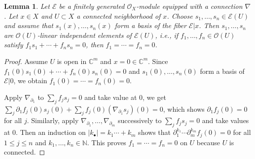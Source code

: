 \documentclass[12pt,a4paper,notitlepage]{report}
\theoremstyle{definition}
\theoremstyle{plain}
\newtheorem{lm}[df]{Lemma}
\newcommand{\id}{\mathbf{1}}
\newcommand{\scr}{\mathscr}
\newcommand{\mbb}{\mathbb}
\newcommand{\blt}{\bullet}
\newcommand{\Cbb}{\mathbb C}
\newcommand{\Nbb}{\mathbb N}
\numberwithin{equation}{section}
\begin{document}






\begin{lm}\label{lb61}
Let $\scr E$ be a finitely generated $\scr O_X$-module equipped with a connection $\nabla$. Let $x\in X$ and $U\subset X$ a connected neighborhood of $x$.  Choose $s_1,\dots,s_n\in\scr E(U)$ and assume that $s_1(x),\dots,s_n(x)$ form a basis of the fiber $\scr E|x$. Then $s_1,\dots,s_n$ are $\scr O(U)$-linear independent elements of $\scr E(U)$, i.e., if $f_1,\dots,f_n\in\scr O(U)$ satisfy $f_1s_1+\cdots+f_ns_n=0$, then $f_1=\cdots=f_n=0$.
\end{lm}



\begin{proof}
Assume $U$ is open in $\Cbb^m$ and $x=0\in\Cbb^m$. Since $f_1(0)s_1(0)+\cdots +f_n(0)s_n(0)=0$ and $s_1(0),\dots,s_n(0)$ form a basis of $\scr E|0$, we obtain $f_1(0)=\cdots=f_n(0)=0$.	

Apply $\nabla_{\partial_1}$ to $\sum_j f_js_j=0$ and take value at $0$, we get $\sum_j\partial_1f_j(0)s_j(0)+\sum_j f_j(0)(\nabla_{\partial_1}s_j)(0)=0$, which shows $\partial_1 f_j(0)=0$ for all $j$. Similarly, apply $\nabla_{\partial_1},\dots,\nabla_{\partial_m}$ successively to $\sum_j f_js_j=0$ and take values at $0$. Then an induction on  $|k_\blt|=k_1\cdots+k_m$ shows that $\partial_1^{k_1}\cdots \partial_m^{k_m}f_j(0)=0$ for all $1\leq j\leq n$ and $k_1,\dots,k_n\in\Nbb$. This proves $f_1=\cdots=f_n=0$ on $U$ because $U$ is connected.
\end{proof}



\end{document}
